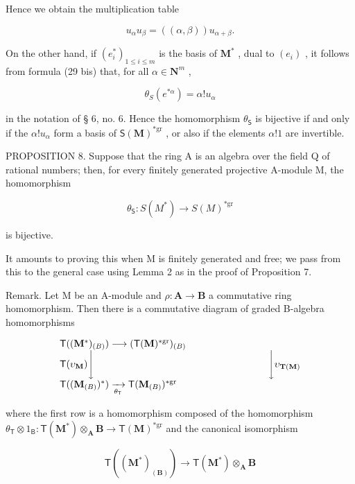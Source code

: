 Hence we obtain the multiplication table

\[
u _ {\alpha} u _ {\beta} = ((\alpha , \beta)) u _ {\alpha + \beta}.\tag{33}
\]

On the other hand, if \((e_i^*)_{1\leq i\leq m}\) is the basis of \(\mathbf{M}^*\) , dual to \((e_i)\) , it follows from formula (29 bis) that, for all \(\alpha \in \mathbf{N}^m\) ,

\[
\theta_ {S} (e ^ {* \alpha}) = \alpha ! u _ {\alpha}\tag{34}
\]

in the notation of § 6, no. 6. Hence the homomorphism \(\theta_{\mathsf{S}}\) is bijective if and only if the \(\alpha!u_{\alpha}\) form a basis of \(\mathsf{S}(\mathbf{M})^{*\mathrm{gr}}\) , or also if the elements \(\alpha!1\) are invertible.

PROPOSITION 8. Suppose that the ring A is an algebra over the field Q of rational numbers; then, for every finitely generated projective A-module M, the homomorphism

\[
\theta_ {\mathsf {S}}: S (M ^ {*}) \rightarrow S (M) ^ {* \mathrm{gr}}
\]

is bijective.

It amounts to proving this when M is finitely generated and free; we pass from this to the general case using Lemma 2 as in the proof of Proposition 7.

Remark. Let M be an A-module and \(\rho: \mathbf{A} \to \mathbf{B}\) a commutative ring homomorphism. Then there is a commutative diagram of graded B-algebra homomorphisms

\[
\begin{array}{l} \mathsf {T} ((\mathbf {M} ^ {*}) _ {(B)}) \longrightarrow (\mathsf {T} (\mathbf {M}) ^ {* \mathrm{gr}}) _ {(B)} \\ \mathsf {T} (\upsilon_ {\mathbf {M}}) \Biggl \downarrow \qquad \qquad \qquad \qquad \qquad \qquad \qquad \qquad \qquad \Biggl \downarrow \upsilon_ {\mathbf {T} (\mathbf {M})} \\ \mathsf {T} ((\mathbf {M} _ {(B)}) ^ {*}) \xrightarrow [ \theta_ {\mathsf {T}} ]{} \mathsf {T} (\mathbf {M} _ {(B)}) ^ {* \mathrm{gr}} \end{array}
\]

where the first row is a homomorphism composed of the homomorphism \(\theta_{\mathsf{T}}\otimes 1_{\mathsf{B}}\colon \mathsf{T}(\mathbf{M}^{*})\otimes_{\mathbf{A}}\mathbf{B}\to \mathsf{T}(\mathbf{M})^{*\mathrm{gr}}\) and the canonical isomorphism

\[
\mathsf {T} ((\mathbf {M} ^ {*}) _ {(\mathbf {B})}) \rightarrow \mathsf {T} (\mathbf {M} ^ {*}) \otimes_ {\mathbf {A}} \mathbf {B}
\]

